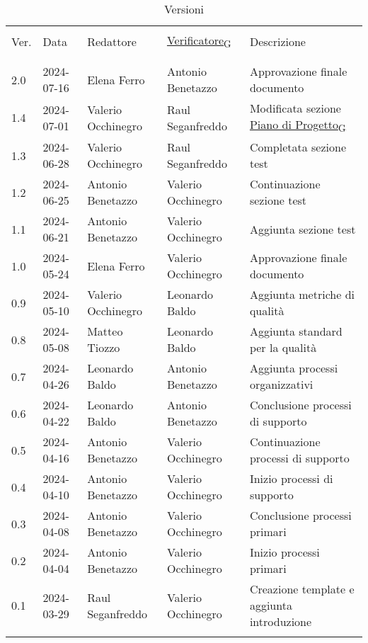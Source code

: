 \documentclass[italian,12pt]{article} %
\begin{document}
 



\newpage



\begin{table}[!h]
	\caption*{Versioni}
	\footnotesize
	\begin{center}
		\begin{tabular}{ l l l l p{6cm} }
			\hline                                                                                                   \\[-2ex]
			Ver. & Data       & Redattore          & \href{https://7last.github.io/docs/pb/documentazione-interna/glossario\#verificatore}{Verificatore\textsubscript{G}}       & Descrizione\\
			\\[-2ex] \hline \\[-1.5ex]
			2.0  & 2024-07-16 & Elena Ferro        & Antonio Benetazzo  & Approvazione finale documento \\
			1.4	 & 2024-07-01 & Valerio Occhinegro & Raul Seganfreddo   & Modificata sezione \href{https://7last.github.io/docs/pb/documentazione-interna/glossario\#piano-di-progetto}{Piano di Progetto\textsubscript{G}} \\
			1.3	 & 2024-06-28 & Valerio Occhinegro & Raul Seganfreddo   & Completata sezione test \\
			1.2  & 2024-06-25 & Antonio Benetazzo  & Valerio Occhinegro & Continuazione sezione test \\
			1.1  & 2024-06-21 & Antonio Benetazzo  & Valerio Occhinegro & Aggiunta sezione test \\
			1.0  & 2024-05-24 & Elena Ferro        & Valerio Occhinegro & Approvazione finale documento \\
			0.9  & 2024-05-10 & Valerio Occhinegro & Leonardo Baldo     & Aggiunta metriche di qualità \\
			0.8  & 2024-05-08 & Matteo Tiozzo      & Leonardo Baldo     & Aggiunta standard per la qualità \\
			0.7  & 2024-04-26 & Leonardo Baldo     & Antonio Benetazzo  & Aggiunta processi organizzativi \\
			0.6  & 2024-04-22 & Leonardo Baldo     & Antonio Benetazzo  & Conclusione processi di supporto \\
			0.5  & 2024-04-16 & Antonio Benetazzo  & Valerio Occhinegro & Continuazione processi di supporto \\
			0.4  & 2024-04-10 & Antonio Benetazzo  & Valerio Occhinegro & Inizio processi di supporto \\
			0.3  & 2024-04-08 & Antonio Benetazzo  & Valerio Occhinegro & Conclusione processi primari \\
			0.2  & 2024-04-04 & Antonio Benetazzo  & Valerio Occhinegro & Inizio processi primari \\
			0.1  & 2024-03-29 & Raul Seganfreddo   & Valerio Occhinegro & Creazione template e aggiunta introduzione \\
			\\[-1.5ex] \hline
		\end{tabular}
	\end{center}
\end{table}
\end{document}
